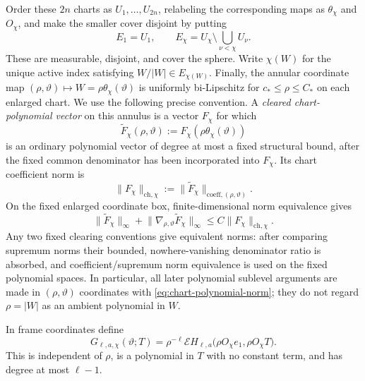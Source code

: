 \documentclass[11pt]{article}
\numberwithin{equation}{section}
\theoremstyle{remark}
\theoremstyle{definition}
\newcommand{\norm}[1]{\lVert #1\rVert}
\begin{document}
Order these \(2n\) charts as \(U_1,\ldots,U_{2n}\), relabeling the
corresponding maps as \(\theta_\chi\) and \(O_\chi\), and make the smaller
cover disjoint by putting
\[
 E_1=U_1,\qquad E_\chi=U_\chi\setminus\bigcup_{\nu<\chi}U_\nu.
\]
These are measurable, disjoint, and cover the sphere.  Write \(\chi(W)\)
for the unique active index satisfying \(W/|W|\in E_{\chi(W)}\).
Finally, the annular coordinate map
\((\rho,\vartheta)\mapsto W=\rho\theta_\chi(\vartheta)\) is uniformly
bi-Lipschitz for \(c_*\le\rho\le C_*\) on each enlarged chart.
We use the following precise convention.  A \emph{cleared
chart-polynomial vector} on this annulus is a vector $F_\chi$ for which
\[
 \widetilde F_\chi(\rho,\vartheta)
 :=F_\chi(\rho\theta_\chi(\vartheta))
\]
is an ordinary polynomial vector of degree at most a fixed structural
bound, after the fixed common denominator has been incorporated into
$F_\chi$.  Its chart coefficient norm is
\begin{equation}\label{eq:chart-polynomial-norm}
 \norm{F_\chi}_{\mathrm{ch},\chi}
 :=\norm{\widetilde F_\chi}_{\mathrm{coeff},(\rho,\vartheta)}.
\end{equation}
On the fixed enlarged coordinate box, finite-dimensional norm equivalence
gives
\begin{equation}\label{eq:chart-polynomial-gradient}
 \norm{\widetilde F_\chi}_\infty+
 \norm{\nabla_{\rho,\vartheta}\widetilde F_\chi}_\infty
 \le C\norm{F_\chi}_{\mathrm{ch},\chi}.
\end{equation}
Any two fixed clearing conventions give equivalent norms: after comparing
supremum norms their bounded, nowhere-vanishing denominator ratio is
absorbed, and coefficient/supremum norm equivalence is used on the fixed
polynomial spaces.  In particular, all later polynomial sublevel
arguments are made in $(\rho,\vartheta)$ coordinates with
\eqref{eq:chart-polynomial-norm}; they do not regard $\rho=|W|$ as an
ambient polynomial in $W$.

In frame coordinates define
\begin{equation}\label{eq:oriented-chart-polynomial}
 G_{\ell,a,\chi}(\vartheta;T)
 =\rho^{-\ell}\mathcal EH_{\ell,a}
 \bigl(\rho O_\chi e_1,\rho O_\chi T\bigr).
\end{equation}
This is independent of \(\rho\), is a polynomial in \(T\) with no
constant term, and has degree at most \(\ell-1\).
\end{document}
